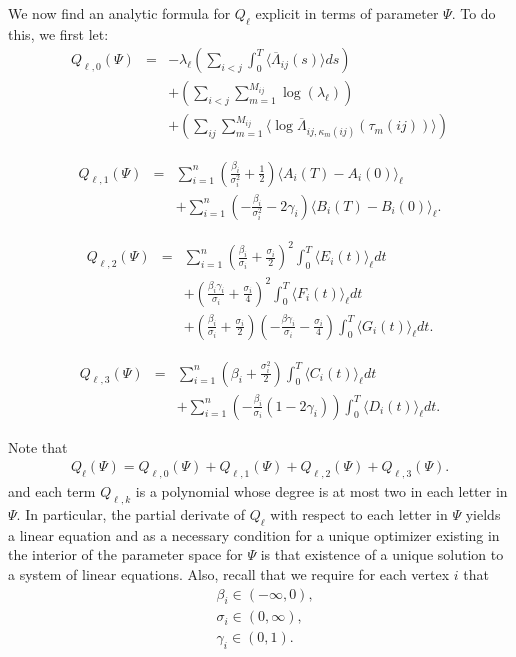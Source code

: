 \documentclass[12pt]{article}%
\begin{document}
We now find an analytic formula for $Q_\ell$ explicit in terms of parameter $\Psi$. 
To do this, we first let:
\begin{eqnarray*}
Q_{\ell,0}(\Psi) 
&=& -\lambda_\ell \left( \sum_{i<j} \int_0^T \langle \overline{\Lambda}_{ij}(s)\rangle ds\right)\\
& & + \left(\sum_{i<j} \sum_{m=1}^{M_{ij}} \log(\lambda_\ell) \right)\\
& & + \left( \sum_{ij} \sum_{m=1}^{M_{ij}} \langle \log \overline \Lambda_{ij,\kappa_{m}(ij)}(\tau_m(ij))\rangle \right)
\end{eqnarray*}

\begin{eqnarray*}
Q_{\ell,1}(\Psi) 
&=& \sum_{i=1}^n \left(\frac{\beta_i}{\sigma_i^2} + \frac{1}{2}\right) \langle A_i(T) - A_i(0) \rangle_\ell \\
&\ & +   \sum_{i=1}^n \left(-\frac{\beta_i}{\sigma_i^2} - 2\gamma_i\right)\langle B_i(T) - B_i(0) \rangle_\ell. 
\end{eqnarray*}


\begin{eqnarray*}
Q_{\ell,2}(\Psi) &=& \sum_{i=1}^n \left(\frac{\beta_i}{\sigma_i} + \frac{\sigma_i}{2}\right)^2 \int_0^T \langle E_i(t)\rangle_\ell dt  \\
&\ & + \left( \frac{\beta_i \gamma_i}{\sigma_i} + \frac{\sigma_i}{4}\right)^2
\int_0^T \langle F_i(t)\rangle_\ell dt  \\
&\ & + 
\left(\frac{\beta_i}{\sigma_i} + \frac{\sigma_i}{2}\right)
\left(-\frac{\beta \gamma_i}{\sigma_i} - \frac{\sigma_i}{4}\right)
\int_0^T \langle G_i(t) \rangle_\ell dt.
\end{eqnarray*}

\begin{eqnarray*}
Q_{\ell,3}(\Psi) &=& \sum_{i=1}^n \left( \beta_i + \frac{\sigma_i^2}{2}\right) \int_0^T \langle C_i(t) \rangle_\ell dt\\
&\ & + \sum_{i=1}^n \left(-\frac{\beta_i}{\sigma_i} (1-2\gamma_i) \right) \int_0^T \langle D_i(t) \rangle_\ell dt. 
\end{eqnarray*}

Note that 
\begin{eqnarray}
Q_\ell(\Psi) = 
Q_{\ell,0}(\Psi)+
Q_{\ell,1}(\Psi)+
Q_{\ell,2}(\Psi)+
Q_{\ell,3}(\Psi).
\end{eqnarray}
and each term $Q_{\ell,k}$ is a polynomial whose degree is at most two in each letter in $\Psi$.
In particular, the partial derivate of $Q_\ell$ with respect to each letter in $\Psi$ yields a linear equation and as a necessary condition for a unique optimizer existing in the interior of the parameter space for $\Psi$ is that existence of a unique solution to a system of linear equations. Also, recall that we require for each vertex $i$ that 
\begin{eqnarray}
&\beta_i \in (-\infty,0), \\
&\sigma_i \in (0,\infty), \\
&\gamma_i \in (0,1).
\end{eqnarray}
\end{document}
